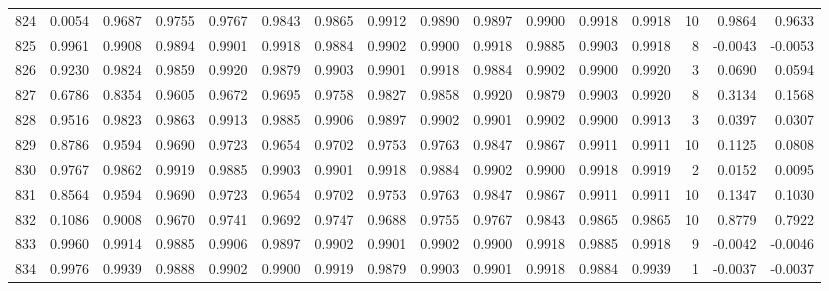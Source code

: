 \begin{tabular}{lrrrrrrrrrrrrrrr}
824 &      0.0054 &  0.9687 &  0.9755 &  0.9767 &  0.9843 &  0.9865 &  0.9912 &  0.9890 &  0.9897 &  0.9900 &   0.9918 &     0.9918 &     10 &                    0.9864 &                     0.9633 \\
825 &      0.9961 &  0.9908 &  0.9894 &  0.9901 &  0.9918 &  0.9884 &  0.9902 &  0.9900 &  0.9918 &  0.9885 &   0.9903 &     0.9918 &      8 &                   -0.0043 &                    -0.0053 \\
826 &      0.9230 &  0.9824 &  0.9859 &  0.9920 &  0.9879 &  0.9903 &  0.9901 &  0.9918 &  0.9884 &  0.9902 &   0.9900 &     0.9920 &      3 &                    0.0690 &                     0.0594 \\
827 &      0.6786 &  0.8354 &  0.9605 &  0.9672 &  0.9695 &  0.9758 &  0.9827 &  0.9858 &  0.9920 &  0.9879 &   0.9903 &     0.9920 &      8 &                    0.3134 &                     0.1568 \\
828 &      0.9516 &  0.9823 &  0.9863 &  0.9913 &  0.9885 &  0.9906 &  0.9897 &  0.9902 &  0.9901 &  0.9902 &   0.9900 &     0.9913 &      3 &                    0.0397 &                     0.0307 \\
829 &      0.8786 &  0.9594 &  0.9690 &  0.9723 &  0.9654 &  0.9702 &  0.9753 &  0.9763 &  0.9847 &  0.9867 &   0.9911 &     0.9911 &     10 &                    0.1125 &                     0.0808 \\
830 &      0.9767 &  0.9862 &  0.9919 &  0.9885 &  0.9903 &  0.9901 &  0.9918 &  0.9884 &  0.9902 &  0.9900 &   0.9918 &     0.9919 &      2 &                    0.0152 &                     0.0095 \\
831 &      0.8564 &  0.9594 &  0.9690 &  0.9723 &  0.9654 &  0.9702 &  0.9753 &  0.9763 &  0.9847 &  0.9867 &   0.9911 &     0.9911 &     10 &                    0.1347 &                     0.1030 \\
832 &      0.1086 &  0.9008 &  0.9670 &  0.9741 &  0.9692 &  0.9747 &  0.9688 &  0.9755 &  0.9767 &  0.9843 &   0.9865 &     0.9865 &     10 &                    0.8779 &                     0.7922 \\
833 &      0.9960 &  0.9914 &  0.9885 &  0.9906 &  0.9897 &  0.9902 &  0.9901 &  0.9902 &  0.9900 &  0.9918 &   0.9885 &     0.9918 &      9 &                   -0.0042 &                    -0.0046 \\
834 &      0.9976 &  0.9939 &  0.9888 &  0.9902 &  0.9900 &  0.9919 &  0.9879 &  0.9903 &  0.9901 &  0.9918 &   0.9884 &     0.9939 &      1 &                   -0.0037 &                    -0.0037 \\

\end{tabular}
